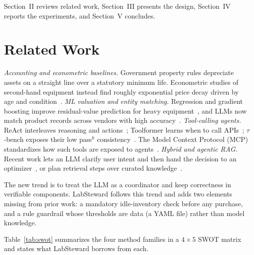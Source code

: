 \documentclass[conference]{IEEEtran}
\begin{document}
Section~II reviews related work, Section~III presents the design,
Section~IV reports the experiments, and Section~V concludes.

\section{Related Work}
\textit{Accounting and econometric baselines.} Government property rules
depreciate assets on a straight line over a statutory minimum life.
Econometric studies of second-hand equipment instead find roughly
exponential price decay driven by age and condition~\cite{reznicek_price}.
\textit{ML valuation and entity matching.} Regression and gradient
boosting improve residual-value prediction for heavy
equipment~\cite{huymajer2025residual}, and LLMs now match product
records across vendors with high accuracy~\cite{peeters2025entity}.
\textit{Tool-calling agents.} ReAct interleaves reasoning and
actions~\cite{yao2023react}; Toolformer learns when to call
APIs~\cite{schick2023toolformer}; $\tau$-bench exposes their low
pass$^k$ consistency~\cite{yao2024taubench}. The Model Context Protocol
(MCP) standardizes how such tools are exposed to agents~\cite{mcp2024}.
\textit{Hybrid and agentic RAG.} Recent work lets an LLM clarify user
intent and then hand the decision to an optimizer~\cite{duan2025askclarify},
or plan retrieval steps over curated knowledge~\cite{singh2025agenticrag}.

The new trend is to treat the LLM as a coordinator and keep correctness
in verifiable components. LabSteward follows this trend and adds two
elements missing from prior work: a mandatory idle-inventory check before
any purchase, and a rule guardrail whose thresholds are data (a YAML
file) rather than model knowledge.

Table~\ref{tab:swot} summarizes the four method families in a
$4\times5$ SWOT matrix and states what LabSteward borrows from each.
\end{document}
